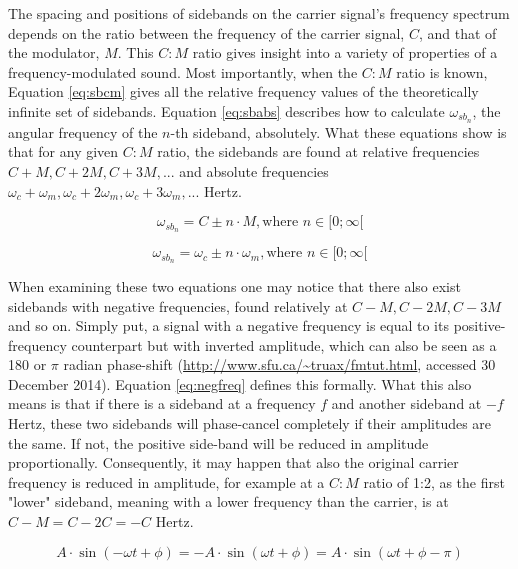   The spacing and positions of sidebands on the carrier signal's frequency spectrum depends on the ratio between the frequency of the carrier signal, $C$, and that of the modulator, $M$. This $C:M$ ratio gives insight into a variety of properties of a frequency-modulated sound. Most importantly, when the $C:M$ ratio is known, Equation \ref{eq:sbcm} gives all the relative frequency values of the theoretically infinite set of sidebands. Equation \ref{eq:sbabs} describes how to calculate $\omega_{sb_{n}}$, the angular frequency of the $n$-th sideband, absolutely. What these equations show is that for any given $C:M$ ratio, the sidebands are found at relative frequencies $C + M, C + 2M, C + 3M, ... $ and absolute frequencies %
  $\omega_{c} + \omega_{m}, \omega_{c} + 2 \omega_{m},\omega_{c} + 3 \omega_{m}, ...$ Hertz.

  \begin{equation}
    \omega_{{sb}_{n}} = C \pm n \cdot M, \text{where } n \in [0;\infty[
    \label{eq:sbcm}
  \end{equation}

  \begin{equation}
    \omega_{{sb}_{n}} = \omega_{c} \pm n \cdot \omega_{m}, \text{where } n \in [0;\infty[
    \label{eq:sbabs}
  \end{equation}

  \noindent When examining these two equations one may notice that there also exist sidebands with negative frequencies, found relatively at $C - M, C - 2M, C - 3M$ and so on. Simply put, a signal with a negative frequency is equal to its positive-frequency counterpart but with inverted amplitude, which can also be seen as a 180\degree{} or $\pi$ radian phase-shift (\url{http://www.sfu.ca/~truax/fmtut.html}, accessed 30 December 2014). Equation \ref{eq:negfreq} defines this formally. What this also means is that if there is a sideband at a frequency $f$ and another sideband at $-f$ Hertz, these two sidebands will phase-cancel completely if their amplitudes are the same. If not, the positive side-band will be reduced in amplitude proportionally. Consequently, it may happen that also the original carrier frequency is reduced in amplitude, for example at a $C:M$ ratio of 1:2, as the first "lower" sideband, meaning with a lower frequency than the carrier, is at $C - M = C - 2C = -C$ Hertz.

  \begin{equation}
    A \cdot \sin(-\omega t + \phi) = -A \cdot \sin(\omega t + \phi) = A \cdot \sin(\omega t + \phi - \pi)
    \label{eq:negfreq}
  \end{equation}

